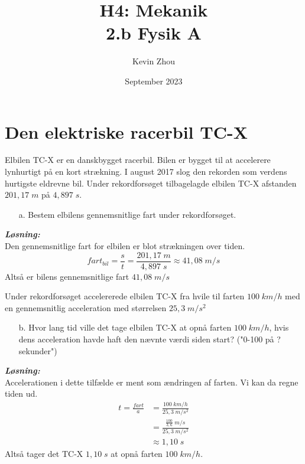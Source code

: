 \documentclass{report}
\title{H4: Mekanik\\
{\Large \textbf{2.b Fysik A}}}
\author{Kevin Zhou}
\date{September 2023}
\newcommand{\sol}{\setlength{\parindent}{0cm}\textbf{\textit{Løsning:}}\setlength{\parindent}{1cm}}
\begin{document}
\maketitle
\chapter{Den elektriske racerbil TC-X}
\begin{question}{}{}
  Elbilen TC-X er en danskbygget racerbil. Bilen er bygget til at accelerere lynhurtigt på en kort strækning.
I august 2017 slog den rekorden som verdens hurtigste eldrevne bil. Under rekordforsøget tilbagelagde elbilen TC-X afstanden $201,17 \; \unit{m}$ på $4,897 \; \unit{s}$.
  \begin{itemize}
    \item[a.] Bestem elbilens gennemsnitlige fart under rekordforsøget.
  \end{itemize}
\end{question}
\sol \\
Den gennemsnitlige fart for elbilen er blot strækningen over tiden.
\[
fart_{bil} = \frac{s}{t} = \frac{201,17 \; \unit{m}}{4,897 \; \unit{s}} \approx 41,08 \; \unit{m/s}
\] 
Altså er bilens gennemsnitlige fart $41,08 \; \unit{m/s}$

\begin{question}{}{}
Under rekordforsøget accelererede elbilen TC-X fra hvile til farten $100 \; \unit{km/h}$ med en gennemsnitlig acceleration med størrelsen $25,3 \; \unit{m/s^2}$ 
\begin{itemize}
  \item[b.] Hvor lang tid ville det tage elbilen TC-X at opnå farten $100 \; \unit{km/h}$, hvis dens acceleration havde haft den nævnte værdi siden start? ("0-100 på ? sekunder") 
\end{itemize}
\end{question}
\sol \\ 
Accelerationen i dette tilfælde er ment som ændringen af farten. Vi kan da regne tiden ud.
\begin{equation*}
\begin{split}
t = \frac{fart}{a} &= \frac{100 \; \unit{km/h}}{25,3 \; \unit{m/s^2}}\\ 
  &= \frac{\frac{100}{3,6}\;\unit{m/s}}{{25,3 \; \unit{m/s^2}}}\\ 
  &\approx 1,10 \;\unit{s}
\end{split} 
\end{equation*}
Altså tager det TC-X $1,10 \;\unit{s}$ at opnå farten $100 \; \unit{km/h}$. 
\end{document}
